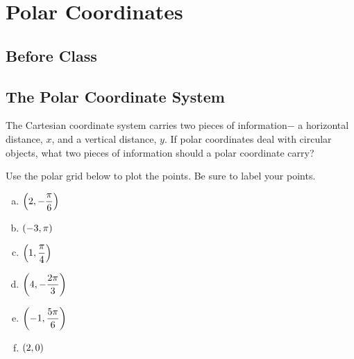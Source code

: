 \documentclass[notes]{subfiles}
\begin{document}
	\fancyhead[LO,RE]{\bfseries \small \currentname}
	\fancyfoot[C]{{}}
	\fancyfoot[RO,LE]{\large \thepage}	%
	
\section*{Polar Coordinates}\label{cs103}
	\subsection*{Before Class}
	\subsection*{The Polar Coordinate System}
		\begin{question}
			The Cartesian coordinate system carries two pieces of information$-$ a horizontal distance, $x$, and a vertical distance, $y$.  If polar coordinates deal with circular objects, what two pieces of information should a polar coordinate carry?
		\end{question}
			\vspace{1.5in}
		\begin{ex}
			Use the polar grid below to plot the points.  Be sure to label your points.
		\end{ex}
			\begin{minipage}{1.5in}
				\begin{enumerate}[(a)]
					\setlength\itemsep{10pt}
					\item $\left( 2,-\dfrac{\pi}{6}\right)$
					\item $\left( -3,\pi\right)$
					\item $\left( 1, \dfrac{\pi}{4}\right)$
					\item $\left( 4,-\dfrac{2\pi}{3}\right)$
					\item $\left( -1,\dfrac{5\pi}{6}\right)$
					\item $\left( 2,0\right)$
				\end{enumerate}
			\end{minipage}
\end{document}
